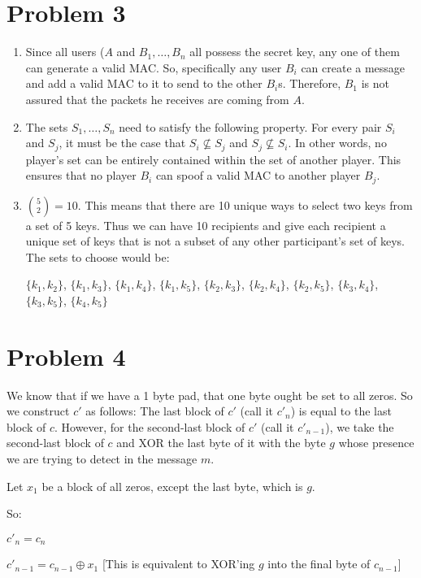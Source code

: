 \documentclass{article}
\begin{document}
\section*{Problem 3}
\begin{enumerate}
\item %
Since all users ($A$ and $B_1, \dots, B_n$ all possess the secret key, any one of them can generate a valid MAC. So, specifically any user $B_i$ can create a message and add a valid MAC to it to send to the other $B_i$s. Therefore, $B_1$ is not assured that the packets he receives are coming from $A$.

\item %
The sets $S_1, \dots , S_n$ need to satisfy the following property. For every pair $S_i$ and $S_j$, it must be the case that $S_i \not\subseteq S_j$ and $S_j \not\subseteq S_i$. In other words, no player's set can be entirely contained within the set of another player. This ensures that no player $B_i$ can spoof a valid MAC to another player $B_j$.

\item %
${5 \choose2} = 10$. This means that there are 10 unique ways to select two keys from a set of 5 keys. Thus we can have 10 recipients and give each recipient a unique set of keys that is not a subset of any other participant's set of keys. The sets to choose would be:

$\{k_1, k_2\}$,
$\{k_1, k_3\}$,
$\{k_1, k_4\}$,
$\{k_1, k_5\}$,
$\{k_2, k_3\}$,
$\{k_2, k_4\}$,
$\{k_2, k_5\}$,
$\{k_3, k_4\}$,
$\{k_3, k_5\}$,
$\{k_4, k_5\}$

\end{enumerate}

\section*{Problem 4}
We know that if we have a 1 byte pad, that one byte ought be set to all zeros. So we construct $c'$ as follows: The last block of $c'$ (call it $c'_n$) is equal to the last block of $c$. However, for the second-last block of $c'$ (call it $c'_{n-1}$), we take the second-last block of $c$ and XOR the last byte of it with the byte $g$ whose presence we are trying to detect in the message $m$. 

Let $x_1$ be a block of all zeros, except the last byte, which is $g$.

So:

$c'_n = c_n$

$c'_{n-1} = c_{n-1} \oplus x_1$  [This is equivalent to XOR'ing $g$ into the final byte of $c_{n-1}$]
\end{document}
